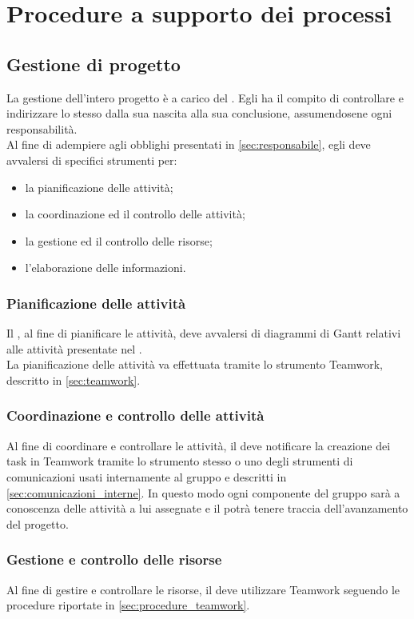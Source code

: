 \section{Procedure a supporto dei processi}
\subsection{Gestione di progetto}
La gestione dell'intero progetto è a carico del \Responsabile. Egli ha il compito di controllare e indirizzare lo stesso dalla sua nascita alla sua conclusione, assumendosene ogni responsabilità.\\
Al fine di adempiere agli obblighi presentati in \sezione\ref{sec:responsabile}, egli deve avvalersi di specifici strumenti per:
\begin{itemize}
	\item la pianificazione delle attività;
	\item la coordinazione ed il controllo delle attività;
	\item la gestione ed il controllo delle risorse;
	\item l'elaborazione delle informazioni.
\end{itemize}

\subsubsection{Pianificazione delle attività}
Il \Responsabile, al fine di pianificare le attività, deve avvalersi di diagrammi di Gantt relativi alle attività presentate nel \PianoDiProgetto.\\
La pianificazione delle attività va effettuata tramite lo strumento Teamwork, descritto in \sezione\ref{sec:teamwork}.

\subsubsection{Coordinazione e controllo delle attività}
Al fine di coordinare e controllare le attività, il \Responsabile\space deve notificare la creazione dei task in Teamwork tramite lo strumento stesso o uno degli strumenti di comunicazioni usati internamente al gruppo e descritti in \sezione\ref{sec:comunicazioni_interne}. In questo modo ogni componente del gruppo sarà a conoscenza delle attività a lui assegnate e il \Responsabile\space potrà tenere traccia dell'avanzamento del progetto.

\subsubsection{Gestione e controllo delle risorse}
Al fine di gestire e controllare le risorse, il \Responsabile\space deve utilizzare Teamwork seguendo le procedure riportate in \sezione \ref{sec:procedure_teamwork}.

